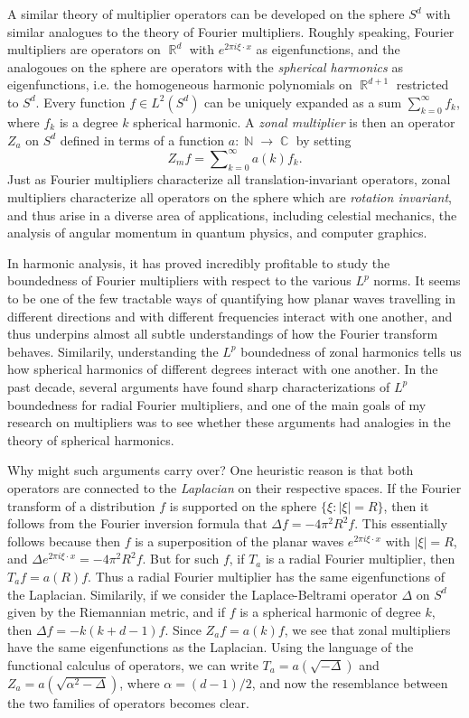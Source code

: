 \documentclass[12pt]{article}
\DeclareMathOperator{\RR}{\mathbb{R}}
\DeclareMathOperator{\NN}{\mathbb{N}}
\DeclareMathOperator{\CC}{\mathbb{C}}
\begin{document}
A similar theory of multiplier operators can be developed on the sphere $S^d$ with similar analogues to the theory of Fourier multipliers. Roughly speaking, Fourier multipliers are operators on $\RR^d$ with $e^{2 \pi i \xi \cdot x}$ as eigenfunctions, and the analogoues on the sphere are operators with the \emph{spherical harmonics} as eigenfunctions, i.e. the homogeneous harmonic polynomials on $\RR^{d+1}$ restricted to $S^d$. Every function $f \in L^2(S^d)$ can be uniquely expanded as a sum $\sum_{k = 0}^\infty f_k$, where $f_k$ is a degree $k$ spherical harmonic. A \emph{zonal multiplier} is then an operator $Z_a$ on $S^d$ defined in terms of a function $a: \NN \to \CC$ by setting
%
\[ Z_m f = \sum\nolimits_{k = 0}^\infty a(k) f_k. \]
%
Just as Fourier multipliers characterize all translation-invariant operators, zonal multipliers characterize all operators on the sphere which are \emph{rotation invariant}, and thus arise in a diverse area of applications, including celestial mechanics, the analysis of angular momentum in quantum physics, and computer graphics.

In harmonic analysis, it has proved incredibly profitable to study the boundedness of Fourier multipliers with respect to the various $L^p$ norms. It seems to be one of the few tractable ways of quantifying how planar waves travelling in different directions and with different frequencies interact with one another, and thus underpins almost all subtle understandings of how the Fourier transform behaves. Similarily, understanding the $L^p$ boundedness of zonal harmonics tells us how spherical harmonics of different degrees interact with one another. In the past decade, several arguments \cite{HeoNazarovSeeger,Cladek,KimQuasiradial} have found sharp characterizations of $L^p$ boundedness for radial Fourier multipliers, and one of the main goals of my research on multipliers was to see whether these arguments had analogies in the theory of spherical harmonics.

Why might such arguments carry over? One heuristic reason is that both operators are connected to the \emph{Laplacian} on their respective spaces. If the Fourier transform of a distribution $f$ is supported on the sphere $\{ \xi : |\xi| = R \}$, then it follows from the Fourier inversion formula that $\Delta f = - 4 \pi^2 R^2 f$. This essentially follows because then $f$ is a superposition of the planar waves $e^{2 \pi i \xi \cdot x}$ with $|\xi| = R$, and $\Delta e^{2 \pi i \xi \cdot x} = - 4\pi^2 R^2 f$. But for such $f$, if $T_a$ is a radial Fourier multiplier, then $T_a f = a(R) f$. Thus a radial Fourier multiplier has the same eigenfunctions of the Laplacian. Similarily, if we consider the Laplace-Beltrami operator $\Delta$ on $S^d$ given by the Riemannian metric, and if $f$ is a spherical harmonic of degree $k$, then $\Delta f = - k(k+d-1) f$. Since $Z_a f = a(k) f$, we see that zonal multipliers have the same eigenfunctions as the Laplacian. Using the language of the functional calculus of operators, we can write $T_a = a( \sqrt{-\Delta} )$ and $Z_a = a( \sqrt{ \alpha^2 - \Delta} )$, where $\alpha = (d-1)/2$, and now the resemblance between the two families of operators becomes clear.
\end{document}
